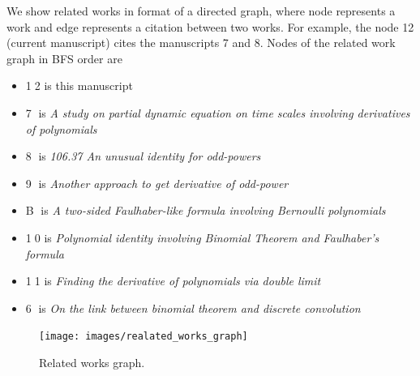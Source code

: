 We show related works in format of a directed graph, where node represents
a work and edge represents a citation between two works.
For example, the node 12 (current manuscript) cites the manuscripts 7 and 8.
Nodes of the related work graph in BFS order are
\begin{itemize}
    \item {\Large \textcircled{\normalsize 12}} is this manuscript
    \item {\Large \textcircled{\normalsize 7}} is \textit{A study on partial dynamic equation on time scales involving derivatives
    of polynomials}~\cite{study_on_partial_dynamic_eq_on_time_scales_with_poly_derivatives}
    \item {\Large \textcircled{\normalsize 8}} is \textit{106.37 An unusual identity for odd-powers}~\cite{unusual_identity_for_odd_powers}
    \item {\Large \textcircled{\normalsize 9}} is \textit{Another approach to get derivative of odd-power}~\cite{another_approach_to_get_derivative_of_odd_power}
    \item {\Large \textcircled{\normalsize B}} is \textit{A two-sided Faulhaber-like formula involving Bernoulli polynomials}~\cite{barbero2020two}
    \item {\Large \textcircled{\normalsize 10}} is \textit{Polynomial identity involving Binomial Theorem and Faulhaber's formula}~\cite{polynomial_identity_with_binomial_theorem_and_faulhabers_formula}
    \item {\Large \textcircled{\normalsize 11}} is \textit{Finding the derivative of polynomials via double limit}~\cite{derivative_of_polynomials_via_double_limit}
    \item {\Large \textcircled{\normalsize 6}} is \textit{On the link between binomial theorem and discrete convolution}~\cite{on_the_link_between_binomial_theorem_and_discrete_convolution}
\end{itemize}
\begin{figure}[H]
    \centering
    \texttt{[image: images/realated\_works\_graph]}
    ~\caption{Related works graph.}\label{fig:related-works-graph}
\end{figure}
